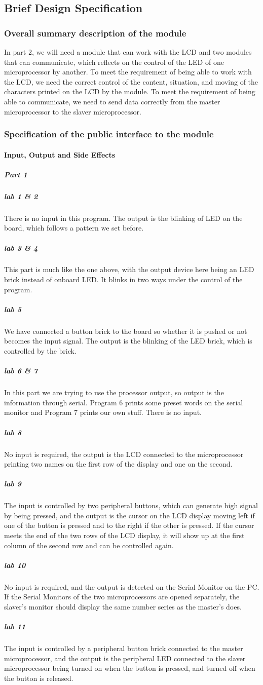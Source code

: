 \subsection{Brief Design Specification}
\subsubsection{Overall summary description of the module}
In part 2, we will need a module that can work with the LCD and two modules that can communicate, which reflects on the control of the LED of one microprocessor by another. To meet the requirement of being able to work with the LCD, we need the correct control of the content, situation, and moving of the characters printed on the LCD by the module. To meet the requirement of being able to communicate, we need to send data correctly from the master microprocessor to the slaver microprocessor.
\subsubsection{Specification of the public interface to the module}

\paragraph{Input, Output and Side Effects}
\subparagraph{Part 1}
\subparagraph{lab 1 \& 2}
There is no input in this program. The output is the blinking of LED on the board, which follows a pattern we set before. 
\subparagraph{lab 3 \& 4}
This part is much like the one above, with the output device here being an LED brick instead of onboard LED. It blinks in two ways under the control of the program.
\subparagraph{lab 5}
We have connected a button brick to the board so whether it is pushed or not becomes the input signal. The output is the blinking of the LED brick, which is controlled by the brick.
\subparagraph{lab 6 \& 7}
In this part we are trying to use the processor output, so output is the information through serial. Program 6 prints some preset words on the serial monitor and Program 7 prints our own stuff. There is no input.
\subparagraph{lab 8} 
No input is required, the output is the LCD connected to the microprocessor printing two names on the first row of the display and one on the second.
\subparagraph{lab 9}
The input is controlled by two peripheral buttons, which can generate high signal by being pressed, and the output is the cursor on the LCD display moving left if one of the button is pressed and to the right if the other is pressed. If the cursor meets the end of the two rows of the LCD display, it will show up at the first column of the second row and can be controlled again.
\subparagraph{lab 10}
No input is required, and the output is detected on the Serial Monitor on the PC. If the Serial Monitors of the two microprocessors are opened separately, the slaver's monitor should display the same number series as the master's does. 
\subparagraph{lab 11}
The input is controlled by a peripheral button brick connected to the master microprocessor, and the output is the peripheral LED connected to the slaver microprocessor being turned on when the button is pressed, and turned off when the button is released.
